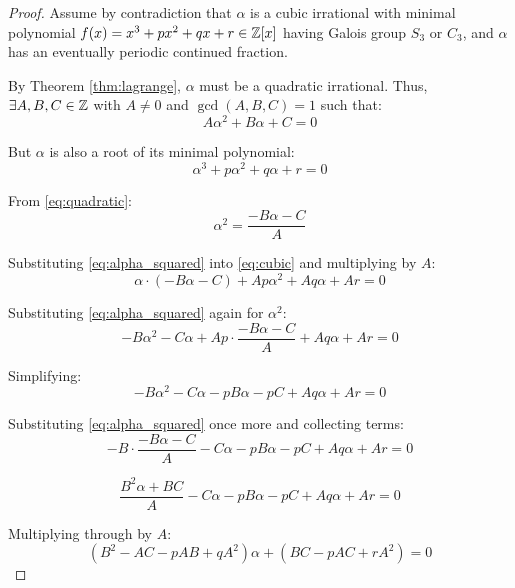 \begin{proof}
Assume by contradiction that $\alpha$ is a cubic irrational with minimal polynomial $f(x) = x^3 + px^2 + qx + r \in \mathbb{Z}[x]$ having Galois group $S_3$ or $C_3$, and $\alpha$ has an eventually periodic continued fraction.

By Theorem \ref{thm:lagrange}, $\alpha$ must be a quadratic irrational. Thus, $\exists A, B, C \in \mathbb{Z}$ with $A \neq 0$ and $\gcd(A, B, C) = 1$ such that:
\begin{equation}\label{eq:quadratic}
A\alpha^2 + B\alpha + C = 0
\end{equation}

But $\alpha$ is also a root of its minimal polynomial:
\begin{equation}\label{eq:cubic}
\alpha^3 + p\alpha^2 + q\alpha + r = 0
\end{equation}

From \eqref{eq:quadratic}:
\begin{equation}\label{eq:alpha_squared}
\alpha^2 = \frac{-B\alpha - C}{A}
\end{equation}

Substituting \eqref{eq:alpha_squared} into \eqref{eq:cubic} and multiplying by $A$:
\begin{equation}
\alpha \cdot (-B\alpha - C) + Ap\alpha^2 + Aq\alpha + Ar = 0
\end{equation}

Substituting \eqref{eq:alpha_squared} again for $\alpha^2$:
\begin{equation}
-B\alpha^2 - C\alpha + Ap \cdot \frac{-B\alpha - C}{A} + Aq\alpha + Ar = 0
\end{equation}

Simplifying:
\begin{equation}
-B\alpha^2 - C\alpha - pB\alpha - pC + Aq\alpha + Ar = 0
\end{equation}

Substituting \eqref{eq:alpha_squared} once more and collecting terms:
\begin{equation}
-B\cdot\frac{-B\alpha - C}{A} - C\alpha - pB\alpha - pC + Aq\alpha + Ar = 0
\end{equation}

\begin{equation}
\frac{B^2\alpha + BC}{A} - C\alpha - pB\alpha - pC + Aq\alpha + Ar = 0
\end{equation}

Multiplying through by $A$:
\begin{equation}\label{eq:combined}
(B^2 - AC - pAB + qA^2)\alpha + (BC - pAC + rA^2) = 0
\end{equation}


\end{proof}
